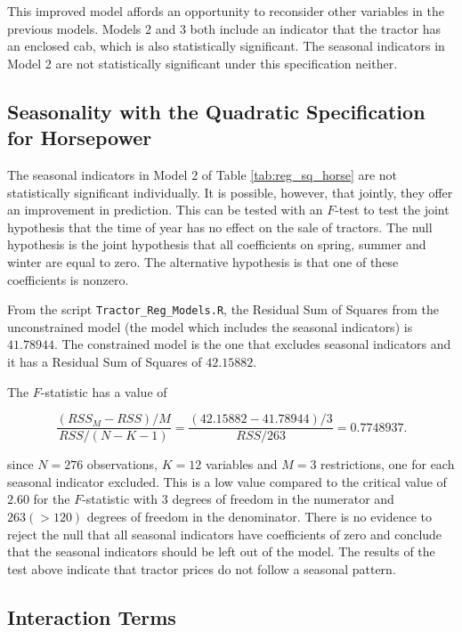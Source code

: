 This improved model affords an opportunity
to reconsider other variables in the previous models.
Models 2 and 3 both include an indicator that the
tractor has an enclosed cab, 
which is also statistically significant. 
The seasonal indicators in Model 2 are not statistically significant under this specification neither. 

\clearpage
\subsection{Seasonality with the Quadratic Specification for Horsepower}


The seasonal indicators in Model 2 
of Table \ref{tab:reg_sq_horse}
are not statistically significant individually.
It is possible, however, that jointly, they 
offer an improvement in prediction. 
This can be tested with an $F$-test
to test the joint hypothesis that the time of year has no effect on the sale of tractors. 
%
The null hypothesis is the joint hypothesis that all coefficients on spring, summer and winter are equal to zero. 
The alternative hypothesis is that one of these coefficients is nonzero. 
% 

From the script \texttt{Tractor\_Reg\_Models.R}, the Residual Sum of Squares from the unconstrained model (the model which includes the seasonal indicators) is $41.78944$. 
The constrained model is the one that excludes seasonal indicators and it has a Residual Sum of Squares of $42.15882$.

The $F$-statistic has a value of 

$$ 
\frac{(RSS_M - RSS)/M}{RSS/(N - K - 1)} = \frac{(42.15882 - 41.78944)/3}{RSS/263} = 0.7748937. 
$$

since $N = 276$ observations, $K = 12$ variables and $M = 3$ restrictions, one for each seasonal indicator excluded. 
This is a low value compared to the critical value of $2.60$ for the $F$-statistic with $3$ degrees of freedom in the numerator and $263 (> 120)$ degrees of freedom in the denominator. 
There is no evidence to reject the null that all seasonal indicators have coefficients of zero and conclude that the seasonal indicators should be left out of the model. 
%
The results of the test above indicate that tractor prices do not follow a seasonal pattern. 


\clearpage
\subsection{Interaction Terms}


